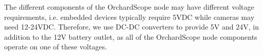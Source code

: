 The different components of the OrchardScope node may have different voltage requirements, i.e. embedded devices typically require 5VDC while cameras may need 12-24VDC. Therefore, we use DC-DC converters to provide 5V and 24V, in addition to the 12V battery outlet, as all of the OrchardScope node components operate on one of these voltages. 




